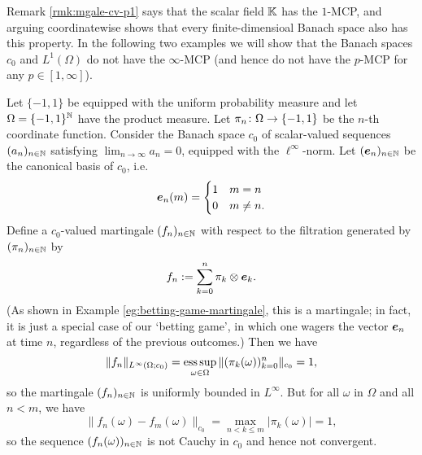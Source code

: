 Remark \ref{rmk:mgale-cv-p1} says that the scalar field $\mathbb{K}$ has the $1$-MCP, and arguing coordinatewise shows that every finite-dimensioal Banach space also has this property.
In the following two examples we will show that the Banach spaces $c_0$ and $L^1(\Omega)$ do not have the $\infty$-MCP (and hence do not have the $p$-MCP for any $p \in [1,\infty]$). 

\begin{example}\label{eg:c0-noMCP}
  Let $\{-1,1\}$ be equipped with the uniform probability measure and let $\Omega = \{-1,1\}^{\mathbb{N}}$ have the product measure.
  Let $\pi_n \colon \Omega \rightarrow \{-1,1\}$ be the $n$-th coordinate function.
  Consider the Banach space $c_0$ of scalar-valued sequences $(a_n)_{n \in \mathbb{N}}$ satisfying $\lim_{n \to \infty} a_n = 0$, equipped with the $\ell^\infty$-norm.
  Let $(\bm{e}_n)_{n \in \mathbb{N}}$ be the canonical basis of $c_0$, i.e.
  \begin{equation*}
    \bm{e}_n(m) = \begin{cases} 1 & m=n \\ 0 & m \neq n. \end{cases}
  \end{equation*}
  Define a $c_0$-valued martingale $(f_n)_{n \in \mathbb{N}}$ with respect to the filtration generated by $(\pi_n)_{n \in \mathbb{N}}$ by
  \begin{equation*}
    f_n := \sum_{k = 0}^{n} \pi_k \otimes \bm{e}_k.
  \end{equation*} 
  (As shown in Example \ref{eg:betting-game-martingale}, this is a martingale; in fact, it is just a special case of our `betting game', in which one wagers the vector $\bm{e}_n$ at time $n$, regardless of the previous outcomes.)
  Then we have
  \begin{equation*}
    \|f_n\|_{L^\infty(\Omega;c_0)} = \operatorname*{ess\,sup}_{\omega \in \Omega} \|(\pi_k(\omega))_{k = 0}^n\|_{c_0} = 1,
  \end{equation*}
  so the martingale $(f_n)_{n \in \mathbb{N}}$ is uniformly bounded in $L^\infty$.
  But for all $\omega$ in $\Omega$ and all $n < m$, we have
  \begin{equation*}
    \|f_n(\omega) - f_m(\omega)\|_{c_0} = \max_{n < k \leq m} |\pi_k(\omega)| = 1,
  \end{equation*}
  so the sequence $(f_n(\omega))_{n \in \mathbb{N}}$ is not Cauchy in $c_0$ and hence not convergent.
\end{example}

